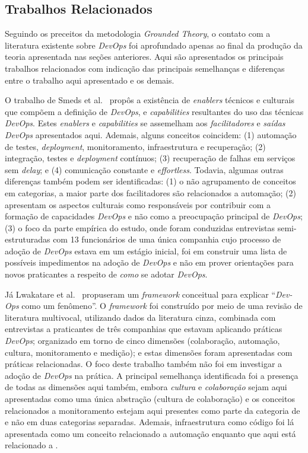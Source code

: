 \subsection{Trabalhos Relacionados}

Seguindo os preceitos da metodologia {\it Grounded Theory}, o contato com a
literatura existente sobre {\it DevOps} foi aprofundado apenas ao final da
produção da teoria apresentada nas seções anteriores. Aqui são apresentados
os principais trabalhos relacionados com indicação das principais semelhanças
e diferenças entre o trabalho aqui apresentado e os demais.

O trabalho de Smeds et al.~\cite{devops_a_definition} propôs a existência de
{\it enablers} técnicos e culturais que compõem a definição de {\it DevOps}, e
{\it capabilities} resultantes do uso das técnicas {\it DevOps}. Estes
{\it enablers} e {\it capabilities} se assemelham aos \emph{facilitadores} e
\emph{saídas DevOps} apresentados aqui. Ademais, alguns conceitos coincidem:
(1) automação de testes, {\it deployment}, monitoramento, infraestrutura e
recuperação; (2) integração, testes e {\it deployment} contínuos; (3) recuperação
de falhas em serviços sem {\it delay}; e (4) comunicação constante e {\it effortless}.
Todavia, algumas outras diferenças também podem ser identificadas: (1) o não
agrupamento de conceitos em categorias, a maior parte dos facilitadores são
relacionados a automação; (2) apresentam os aspectos culturais como responsáveis
por contribuir com a formação de capacidades {\it DevOps} e não como a
preocupação principal de {\it DevOps}; (3) o foco da parte empírica do estudo,
onde foram conduzidas entrevistas semi-estruturadas com 13 funcionários de uma única
companhia cujo processo de adoção de {\it DevOps} estava em um estágio inicial,
foi em construir uma lista de possíveis impedimentos na adoção de {\it DevOps} e
não em prover orientações para novos praticantes a respeito de \emph{como} se
adotar {\it DevOps}.

Já Lwakatare et al.~\cite{dimensions_of_devops,extending_dimensions} propuseram
um {\it framework} conceitual para explicar ``{\it Dev-Ops} como um fenômeno''.
O {\it framework} foi construído por meio de uma revisão de literatura multivocal,
utilizando dados da literatura cinza, combinada com entrevistas a praticantes de
três companhias que estavam aplicando práticas {\it DevOps}; organizado em
torno de cinco dimensões (colaboração, automação, cultura, monitoramento e
medição); e estas dimensões foram apresentadas com práticas relacionadas. O foco
deste trabalho também não foi em investigar a adoção de {\it DevOps} na prática.
A principal semelhança identificada foi a presença de todas as dimensões aqui
também, embora \emph{cultura} e \emph{colaboração} sejam aqui apresentadas como
uma única abstração (cultura de colaboração) e os conceitos relacionados a
monitoramento estejam aqui presentes como parte da categoria de  e não em duas categorias separadas. Ademais, infraestrutura como
código foi lá apresentada como um conceito relacionado a automação enquanto que
aqui está relacionado a .

